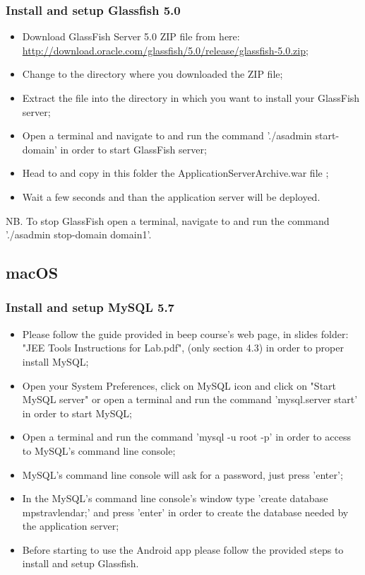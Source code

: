 \subsubsection{Install and setup Glassfish 5.0}
\begin{itemize}
	\item Download GlassFish Server 5.0 ZIP file from here: \\ \href{http://download.oracle.com/glassfish/5.0/release/glassfish-5.0.zip}{\color{blue}http://download.oracle.com/glassfish/5.0/release/glassfish-5.0.zip};
	\item Change to the directory where you downloaded the ZIP file;
	\item Extract the file into the directory in which you want to install your GlassFish server;
	\item Open a terminal and navigate to  and run the command './asadmin start-domain' in order to start GlassFish server;
	\item Head to  and copy in this folder the ApplicationServerArchive.war file ;
	\item Wait a few seconds and than the application server will be deployed.
\end{itemize}
NB. To stop GlassFish open a terminal, navigate to  and run the command './asadmin stop-domain domain1'.

\subsection{macOS}
\label{subsect:macOS}

\subsubsection{Install and setup MySQL 5.7}
\begin{itemize}
	\item Please follow the guide provided in beep course's web page, in slides folder: "JEE Tools Instructions for Lab.pdf", (only section 4.3) in order to proper install MySQL;
	\item Open your System Preferences, click on MySQL icon and click on "Start MySQL server" or open a terminal and run the command 'mysql.server start' in order to start MySQL;
	\item Open a terminal and run the command 'mysql -u root -p' in order to access to MySQL's command line console;
	\item MySQL's command line console will ask for a password, just press 'enter';
	\item In the MySQL's command line console's window type 'create database mps\textunderscore travlendar;' and press 'enter' in order to create the database needed by the application server;
	\item Before starting to use the Android app please follow the provided steps to install and setup Glassfish.
\end{itemize}

